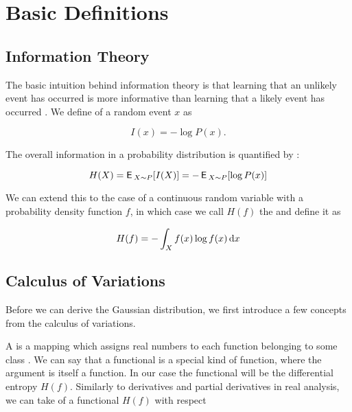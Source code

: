 \chapter{Basic Definitions}

\section{Information Theory}

The basic intuition behind information theory is that learning that an unlikely
event has occurred is more informative than learning that a likely event has
occurred \citep{Goodfellow-et-al-2016}. We define  of
a random event $x$ as


\begin{equation}
  I(x) = -\log P(x).
\end{equation}

The overall information in a probability distribution is quantified by
:

\begin{equation}
  H(X) = \operatorname{\textsf{E}\,}_{X \sim P} [ I(X) ] = -\operatorname{\textsf{E}\,}_{X \sim P} [ \log P(x) ]
\end{equation}

We can extend this to the case of a continuous random variable with a
probability density function $f$, in which case we call $H(f)$ the
 and define it as

\begin{equation}
  H(f) = - \int_X f(x) \log f(x) \mathop{}\!\mathrm{d} x
\end{equation}

\section{Calculus of Variations}

Before we can derive the Gaussian distribution, we first introduce a few
concepts from the calculus of variations.

A  is a mapping which assigns real numbers to each function
belonging to some class \citep{gelfand2012calculus}. We can say that a
functional is a special kind of function, where the argument is itself a
function. In our case the functional will be the differential entropy $H(f)$.
Similarly to derivatives and partial derivatives in real analysis, we can take
 of a functional $H(f)$ with respect

